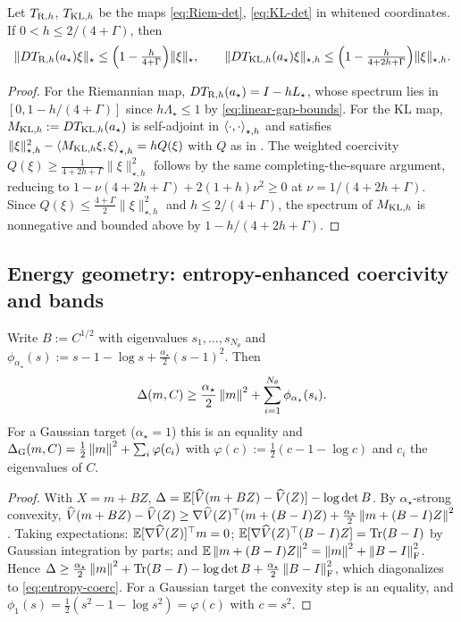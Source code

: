 \begin{proposition}
\label{prop:linearized-maps}
Let $T_{\mathrm{R},h}$, $T_{\mathrm{KL},h}$ be the maps \eqref{eq:Riem-det}, \eqref{eq:KL-det} in whitened
coordinates. If $0<h\leq2/(4+\Gamma)$, then
\[
    \|DT_{\mathrm{R},h}(a_\star)\xi\|_\star\leq\Bigl(1-\tfrac h{4+\Gamma}\Bigr)\|\xi\|_\star,
    \qquad
    \|DT_{\mathrm{KL},h}(a_\star)\xi\|_{\star,h}\leq\Bigl(1-\tfrac h{4+2h+\Gamma}\Bigr)\|\xi\|_{\star,h}.
\]
\end{proposition}

\begin{proof}
For the Riemannian map, $DT_{\mathrm{R},h}(a_\star)=I-hL_\star$, whose spectrum lies in
$[0,1-h/(4+\Gamma)]$ since $h\Lambda_\star\leq1$ by \eqref{eq:linear-gap-bounds}. For the KL map,
$M_{\mathrm{KL},h}:=DT_{\mathrm{KL},h}(a_\star)$ is self-adjoint in $\left\langle \cdot,\cdot\right\rangle_{\star,h}$ and satisfies
$\|\xi\|_{\star,h}^2-\left\langle M_{\mathrm{KL},h}\xi,\xi\right\rangle_{\star,h}=hQ(\xi)$ with $Q$ as in
. The weighted coercivity $Q(\xi)\geq\tfrac1{4+2h+\Gamma}\|\xi\|_{\star,h}^2$
follows by the same completing-the-square argument, reducing to
$1-\nu(4+2h+\Gamma)+2(1+h)\nu^2\geq0$ at $\nu=1/(4+2h+\Gamma)$. Since $Q(\xi)\leq\tfrac{4+\Gamma}2\|\xi\|_{\star,h}^2$
and $h\leq2/(4+\Gamma)$, the spectrum of $M_{\mathrm{KL},h}$ is nonnegative and bounded above by
$1-h/(4+2h+\Gamma)$.
\end{proof}

\subsection{Energy geometry: entropy-enhanced coercivity and bands}

\begin{lemma}
\label{lem:entropy-coerc}
Write $B:=C^{1/2}$ with eigenvalues $s_1,\dots,s_{N_\theta}$ and
$\phi_{\alpha_\star}(s):=s-1-\log s+\tfrac{\alpha_\star}2(s-1)^2$. Then
\begin{equation}
\label{eq:entropy-coerc}
    \Delta(m,C)\geq\frac{\alpha_\star}2\left\lVert m\right\rVert^2+\sum_{i=1}^{N_\theta}\phi_{\alpha_\star}(s_i).
\end{equation}
For a Gaussian target ($\alpha_\star=1$) this is an equality and
$\Delta_{\mathrm G}(m,C)=\tfrac12\left\lVert m\right\rVert^2+\sum_i\varphi(c_i)$ with $\varphi(c):=\tfrac12(c-1-\log c)$
and $c_i$ the eigenvalues of $C$.
\end{lemma}

\begin{proof}
With $X=m+BZ$, $\Delta=\mathbb{E}[\widehat V(m+BZ)-\widehat V(Z)]-\log\det B$. By $\alpha_\star$-strong
convexity, $\widehat V(m+BZ)-\widehat V(Z)\geq\nabla\widehat V(Z)^\top(m+(B-I)Z)+\tfrac{\alpha_\star}2\left\lVert m+(B-I)Z\right\rVert^2$.
Taking expectations: $\mathbb{E}[\nabla\widehat V(Z)]^\top m=0$; $\mathbb{E}[\nabla\widehat V(Z)^\top(B-I)Z]=\operatorname{Tr}(B-I)$
by Gaussian integration by parts; and $\mathbb{E}\left\lVert m+(B-I)Z\right\rVert^2=\left\lVert m\right\rVert^2+\left\lVert B-I\right\rVert_{\mathrm{F}}^2$.
Hence $\Delta\geq\tfrac{\alpha_\star}2\left\lVert m\right\rVert^2+\operatorname{Tr}(B-I)-\log\det B+\tfrac{\alpha_\star}2\left\lVert B-I\right\rVert_{\mathrm{F}}^2$,
which diagonalizes to \eqref{eq:entropy-coerc}. For a Gaussian target the convexity step is an
equality, and $\phi_1(s)=\tfrac12(s^2-1-\log s^2)=\varphi(c)$ with $c=s^2$.
\end{proof}

